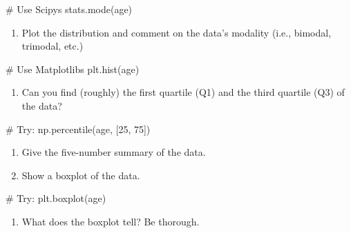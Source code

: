\documentclass[
  letterpaper,
]{scrbook}
\newenvironment{Shaded}{\begin{snugshade}}{\end{snugshade}}
\newcommand{\CommentTok}[1]{\textcolor[rgb]{0.37,0.37,0.37}{#1}}
\providecommand{\tightlist}{%
  \setlength{\itemsep}{0pt}\setlength{\parskip}{0pt}}
\begin{document}
\begin{Shaded}
\begin{Highlighting}[]
\CommentTok{\# Use Scipy\textquotesingle{}s stats.mode(age)}
\end{Highlighting}
\end{Shaded}

\begin{enumerate}
\def\labelenumi{(\alph{enumi})}
\setcounter{enumi}{2}
\tightlist
\item
  Plot the distribution and comment on the data's modality (i.e.,
  bimodal, trimodal, etc.)
\end{enumerate}

\begin{Shaded}
\begin{Highlighting}[]
\CommentTok{\# Use Matplotlib\textquotesingle{}s plt.hist(age)}
\end{Highlighting}
\end{Shaded}

\begin{enumerate}
\def\labelenumi{(\alph{enumi})}
\setcounter{enumi}{3}
\tightlist
\item
  Can you find (roughly) the first quartile (Q1) and the third quartile
  (Q3) of the data?
\end{enumerate}

\begin{Shaded}
\begin{Highlighting}[]
\CommentTok{\# Try: np.percentile(age, [25, 75])}
\end{Highlighting}
\end{Shaded}

\begin{enumerate}
\def\labelenumi{(\alph{enumi})}
\setcounter{enumi}{4}
\item
  Give the five-number summary of the data.
\item
  Show a boxplot of the data.
\end{enumerate}

\begin{Shaded}
\begin{Highlighting}[]
\CommentTok{\# Try: plt.boxplot(age)}
\end{Highlighting}
\end{Shaded}

\begin{enumerate}
\def\labelenumi{(\alph{enumi})}
\setcounter{enumi}{6}
\tightlist
\item
  What does the boxplot tell? Be thorough.
\end{enumerate}
\end{document}
